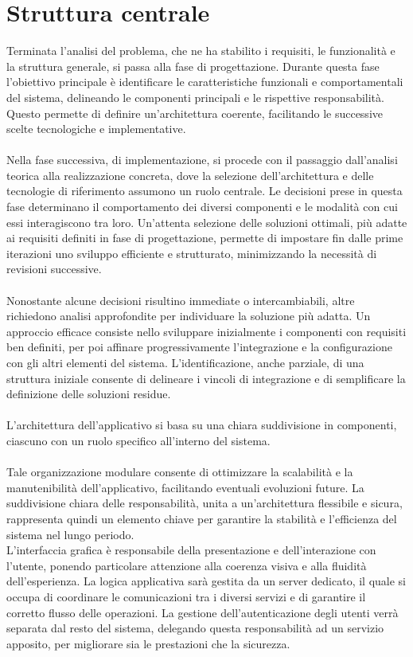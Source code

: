 \section{Struttura centrale}

Terminata l'analisi del problema, che ne ha stabilito i requisiti, le funzionalità e la struttura generale,
si passa alla fase di progettazione.
Durante questa fase l'obiettivo principale è identificare le caratteristiche funzionali e comportamentali del sistema, delineando le componenti principali e le rispettive responsabilità.
Questo permette di definire un'architettura coerente, facilitando le successive scelte tecnologiche e implementative.\\
\\
Nella fase successiva, di implementazione, si procede con il passaggio dall’analisi teorica alla realizzazione concreta,
dove la selezione dell’architettura e delle tecnologie di riferimento assumono un ruolo centrale.
Le decisioni prese in questa fase determinano il comportamento dei diversi componenti e le modalità con cui essi interagiscono tra loro.
Un’attenta selezione delle soluzioni ottimali, più adatte ai requisiti definiti in fase di progettazione,
permette di impostare fin dalle prime iterazioni uno sviluppo efficiente e strutturato, minimizzando la necessità di revisioni successive.\\
\\
Nonostante alcune decisioni risultino immediate o intercambiabili, altre richiedono analisi approfondite per individuare la soluzione più adatta.
Un approccio efficace consiste nello sviluppare inizialmente i componenti con requisiti ben definiti,
per poi affinare progressivamente l'integrazione e la configurazione con gli altri elementi del sistema.
L'identificazione, anche parziale, di una struttura iniziale consente di delineare i vincoli di integrazione e di semplificare la definizione delle soluzioni residue.\\
\\
L’architettura dell’applicativo si basa su una chiara suddivisione in componenti, ciascuno con un ruolo specifico all’interno del sistema.\\
\\
Tale organizzazione modulare consente di ottimizzare la scalabilità e la manutenibilità dell’applicativo,
facilitando eventuali evoluzioni future.
La suddivisione chiara delle responsabilità, unita a un’architettura flessibile e sicura,
rappresenta quindi un elemento chiave per garantire la stabilità e l’efficienza del sistema nel lungo periodo.\\
\clearpage
L'interfaccia grafica è responsabile della presentazione e dell’interazione con l’utente, 
ponendo particolare attenzione alla coerenza visiva e alla fluidità dell’esperienza.
La logica applicativa sarà gestita da un server dedicato, 
il quale si occupa di coordinare le comunicazioni tra i diversi servizi
e di garantire il corretto flusso delle operazioni.
La gestione dell’autenticazione degli utenti verrà separata dal resto del sistema, 
delegando questa responsabilità ad un servizio apposito,
per migliorare sia le prestazioni che la sicurezza.\\
\\

